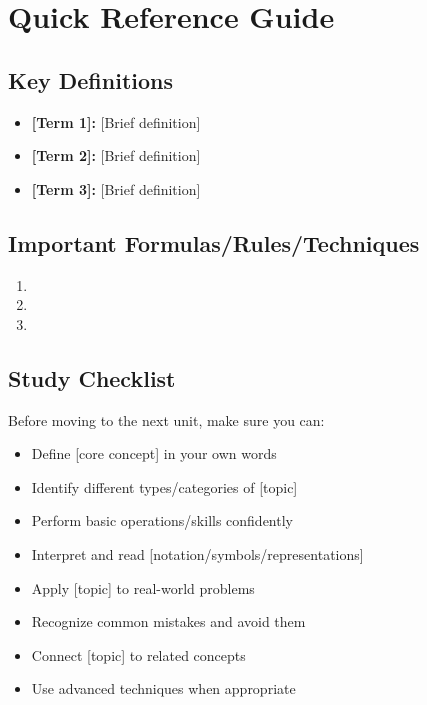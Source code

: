 \documentclass[12pt,letterpaper]{article}
\begin{document}
\appendix

\section{Quick Reference Guide}

\subsection{Key Definitions}

\begin{itemize}
  \item \textbf{[Term 1]:} [Brief definition]
  \item \textbf{[Term 2]:} [Brief definition]
  \item \textbf{[Term 3]:} [Brief definition]
\end{itemize}

\subsection{Important Formulas/Rules/Techniques}

\begin{enumerate}
  \item [Key item 1]
  \item [Key item 2]
  \item [Key item 3]
\end{enumerate}

\subsection{Study Checklist}

Before moving to the next unit, make sure you can:

\begin{itemize}
  \item[$\square$] Define [core concept] in your own words
  \item[$\square$] Identify different types/categories of [topic]
  \item[$\square$] Perform basic operations/skills confidently
  \item[$\square$] Interpret and read [notation/symbols/representations]
  \item[$\square$] Apply [topic] to real-world problems
  \item[$\square$] Recognize common mistakes and avoid them
  \item[$\square$] Connect [topic] to related concepts
  \item[$\square$] Use advanced techniques when appropriate
\end{itemize}
\end{document}
